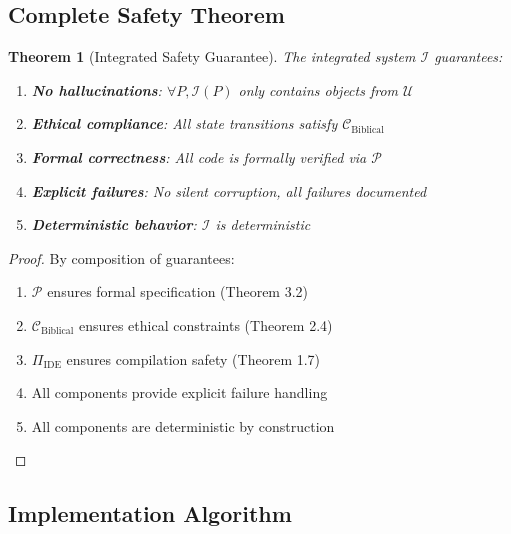 \documentclass[12pt]{article}
\newtheorem{theorem}{Theorem}
\begin{document}
\subsection{Complete Safety Theorem}

\begin{theorem}[Integrated Safety Guarantee]
The integrated system $\mathcal{I}$ guarantees:
\begin{enumerate}
    \item \textbf{No hallucinations}: $\forall P, \mathcal{I}(P)$ only contains objects from $\mathcal{U}$
    \item \textbf{Ethical compliance}: All state transitions satisfy $\mathcal{C}_{\text{Biblical}}$
    \item \textbf{Formal correctness}: All code is formally verified via $\mathcal{P}$
    \item \textbf{Explicit failures}: No silent corruption, all failures documented
    \item \textbf{Deterministic behavior}: $\mathcal{I}$ is deterministic
\end{enumerate}
\end{theorem}

\begin{proof}
By composition of guarantees:
\begin{enumerate}
    \item $\mathcal{P}$ ensures formal specification (Theorem 3.2)
    \item $\mathcal{C}_{\text{Biblical}}$ ensures ethical constraints (Theorem 2.4)
    \item $\Pi_{\text{IDE}}$ ensures compilation safety (Theorem 1.7)
    \item All components provide explicit failure handling
    \item All components are deterministic by construction
\end{enumerate}
\end{proof}

\subsection{Implementation Algorithm}
\end{document}
